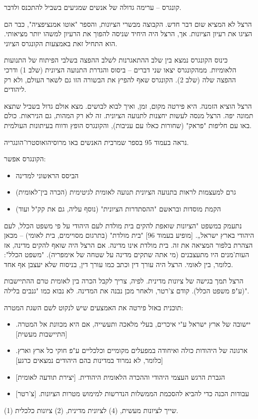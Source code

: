 \documentclass[a4paper]{book}
\begin{document}
	קונגרס – ערימה גדולה של אנשים שמגיעים בשביל להתכנס ולדבר. 
	
	הרצל לא המציא שום דבר חדש. הקבוצה מבשרי הציונות, והספר "אוטו אמנציפציה", כבר הם הציגו את רעיון הציונות. אך, הרצל היה היחיד שניסה להפוך את הרעיון למשהו יותר מציאותי. הוא התחיל זאת באמצעות הקונגרס הציוני. 
	
	כינוס הקונגרס נמצא בין שלב ההתאגרנות לשלב ההפצה בשלבי הפיתוח של התנועות הלאומיות. ממהקונגרס יצאו שני דברים – ביסוס והגדרת התנועה הציונית (שלב 1) ודרכי ההפצה שלה (שלב 2). הקונגרס שאף להפיץ את הבשורה הזו גם לשאר העולם, ולא רק ליהודים. 
	
	הרצל הוציא הזמנה. היא פירטה מקום, זמן, ואיך לבוא לבושים. מצא אולם גדול בשביל שתצא תמונה יפה. הרצל מנסה לעשות יחצנות לתנועה הציונית. זה לא רק המהות, גם הניראות. כולם באו עם חליפות "פראק" (שחורות כאלו עם עניבות), והקונגרס הופץ ודווח בעיתונות העולמית. 
	
	נראה בעמוד 95 בספר שמרבית האנשים באו מרוסיהואוסטרו־הונגריה. 
	
	הקונגרס אפשר: 
	\begin{itemize}
		\item הביסס הראשוני למדינה
		\item גרם למעצמות לראות בתנועה הציונית תנועה לאומית לגיטימית (הכרה בין־לאומית)
		\item הקמת מוסדות ובראשם "ההסתדרות הציונית" (נוסף עליה, גם את קק"ל ועוד)
	\end{itemize}
	
	נתעמק במשפט "הציונות שואפת להקים בית מולדת לעם היהודי על פי משפט הכלל, לעם היהודי בארץ ישראל„. [מופיע בעמוד 96] "בית מולדת" (בתרגום מסויימים, בית לאומי) – מכאן הצהרת בלפור המציאה את זה. בית מולדת אינו מדינה. אם הרצל היה שואף להקים מדינה, אז העות'מנים היו מתעצבנים (מי אתה שתקים מדינה על שטחה של אימפריה). "משפט הכלל": כלומר, בין לאומי. הרצל היה עורך דין וכתב כמו עורך דין, בניסוח שלא יעצבן אף אחד. 
	
	הרצל תמך בגישה של ציונות מדינית. לפיה, צריך לקבל הכרה בין לאומית טרם ההתיישבות (ע"פ משפט הכלל). קודם צ'רטר, ולאחר מכן נבנה את המדינה. לא נבוא כמו "גנבים בלילה". 
	
	תוכנית באזל פירטה את האמצעים שיש לנקוט לשם השגת המטרה: 
	\begin{itemize}
		\item יישובה של ארץ ישראל ע"י איכרים, בעלי מלאכה ותעשייה, אם היא מכוונת אל המטרה. [התיישבות מעשית]
		\item ארגונה של היהודות כולה ואיחודה במפעלים מקומיים וכלכליים ע"פ חוקי כל ארץ וארץ. [כלומר, לא נמרוד במדינות בהם היהודים נמצאים כרגע]
		\item הגברת הרגש העצמי היהודי וההכרה הלאומית היהודית. [יצירת תודעה לאומית]
		\item עבודות הכנה כדי להביא להסכמת הממשלות הנדרשות למימוש מטרות הציונות. [צ'רטר]
	\end{itemize}
	(1) שייך לציונות מעשית, (4) לציונית מדינית, (2) ציונות כלכלית. 
	
\end{document}
